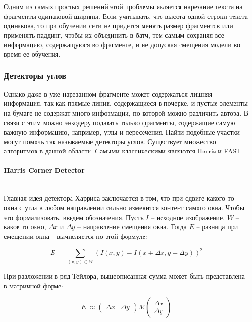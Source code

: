     Одним из самых простых решений этой проблемы является нарезание текста на фрагменты одинаковой ширины. Если учитывать, что высота одной строки текста одинакова, то при обучении сети не придется менять размер фрагментов или применять паддинг, чтобы их объединить в батч, тем самым сохраняя все информацию, содержащуюся во фрагменте, и не допуская смещения модели во время ее обучения. 

\subsubsection{Детекторы углов}

    Однако даже в уже нарезанном фрагменте может содержаться лишняя информация, так как прямые линии, содержащиеся в почерке, и пустые элементы на бумаге не содержат много информации, по которой можно различить автора. В связи с этим можно энкодеру подавать только фрагменты, содержащие самую важную информацию, например, углы и пересечения. Найти подобные участки могут помочь так называемые детекторы углов. Существует множество алгоритмов в данной области. Самыми классическими являются Harris \cite{harris} и FAST \cite{fast}.

    \paragraph{Harris Corner Detector}\mbox{} \\
    Главная идея детектора Харриса заключается в том, что при сдвиге какого-то окна с угла в любом направлении сильно изменится контент самого окна. Чтобы это формализовать, введем обозначения. Пусть $I$ -- исходное изображение, $W$ -- какое то окно, $\Delta x$ и $\Delta y$ -- направление смещения окна. Тогда $E$ -- разница при смещении окна -- вычисляется по этой формуле:

    $$
    E \; = \sum_{(x, y) \in W} \left( I(x, y) - I(x + \Delta x, y + \Delta y)\right)^2
    $$
    \smallskip
    \noindent

    При разложении в ряд Тейлора, вышеописанная сумма может быть представлена в матричной форме:

    $$
    E \; \approx \begin{pmatrix}
        \Delta x & \Delta y
        \end{pmatrix} 
        M\begin{pmatrix}
        \Delta x\\
        \Delta y
        \end{pmatrix}
    $$

